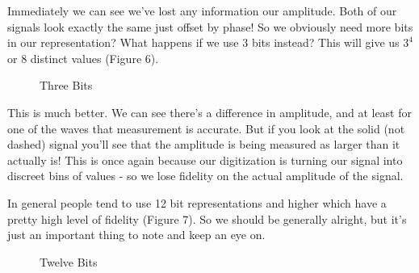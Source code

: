 \documentclass[12pt,a6paper]{book}
\begin{document}
Immediately we can see we've lost any information our amplitude. Both of our signals look exactly the same just offset by phase! So we obviously need more bits in our representation? What happens if we use 3 bits instead? This will give us $3^4$ or $8$ distinct values (Figure 6). 

\begin{figure}[!htb]
\caption{\label{fig:my-label} Three Bits}
\end{figure}

This is much better. We can see there's a difference in amplitude, and at least for one of the waves that measurement is accurate. But if you look at the solid (not dashed) signal you'll see that the amplitude is being measured as larger than it actually is! This is once again because our digitization is turning our signal into discreet bins of values - so we lose fidelity on the actual amplitude of the signal. 

In general people tend to use 12 bit representations and higher which have a pretty high level of fidelity (Figure 7). So we should be generally alright, but it's just an important thing to note and keep an eye on. 

\begin{figure}[!htb]
\caption{\label{fig:my-label} Twelve Bits}
\end{figure}
\end{document}
